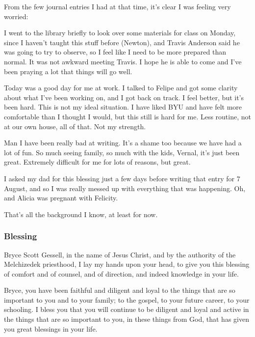 			From the few journal entries I had at that time, it's clear I was feeling very worried:
			
				\begin{compactdesc}
					\item[30 June 2018] I went to the library briefly to look over some materials for class on Monday, since I haven't taught this stuff before (Newton), and Travis Anderson said he was going to try to observe, so I feel like I need to be more prepared than normal. It was not awkward meeting Travis. I hope he is able to come and I've been praying a lot that things will go well.
					\item[16 July 2018] Today was a good day for me at work. I talked to Felipe and got some clarity about what I've been working on, and I got back on track. I feel better, but it's been hard. This is not my ideal situation. I have liked BYU and have felt more comfortable than I thought I would, but this still is hard for me. Less routine, not at our own house, all of that. Not my strength. 
					\item[7 August 2018] Man I have been really bad at writing. It's a shame too because we have had a lot of fun. So much seeing family, so much with the kids, Vernal, it's just been great. Extremely difficult for me for lots of reasons, but great.
				\end{compactdesc}
				
			I asked my dad for this blessing just a few days before writing that entry for 7 August, and so I was really messed up with everything that was happening. Oh, and Alicia was pregnant with Felicity.
			
			That's all the background I know, at least for now.
			
		\subsubsection{Blessing}

			Bryce Scott Gessell, in the name of Jesus Christ, and by the authority of the Melchizedek priesthood, I lay my hands upon your head, to give you this blessing of comfort and of counsel, and of direction, and indeed knowledge in your life.

			Bryce, you have been faithful and diligent and loyal to the things that are so important to you and to your family; to the gospel, to your future career, to your schooling. I bless you that you will continue to be diligent and loyal and active in the things that are so important to you, in these things from God, that has given you great blessings in your life. 

